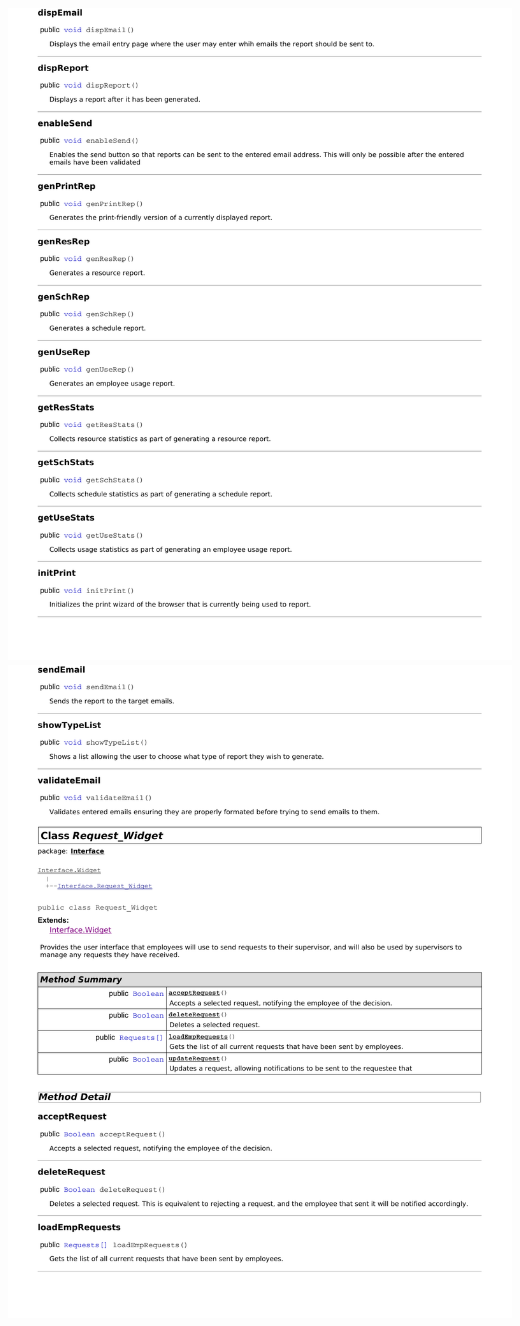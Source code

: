 \documentclass[letterpaper,12pt]{report}
\begin{document}
\newpage
\includegraphics[scale=0.9,trim=20mm 30mm 25mm 25mm]{externals/di8.pdf}
\newpage
\includegraphics[scale=0.9,trim=20mm 30mm 25mm 25mm]{externals/di9.pdf}
\end{document}
